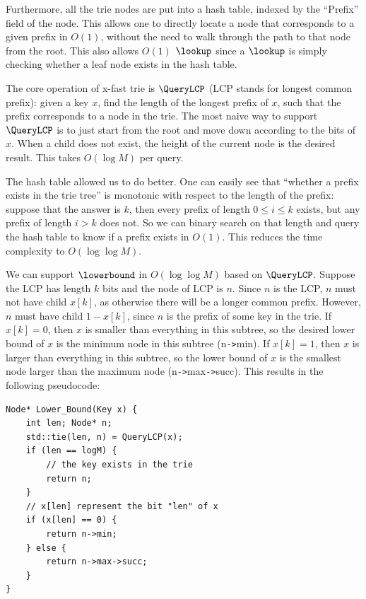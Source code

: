 \documentclass[11pt, usletter]{article}
\begin{document}
Furthermore, all the trie nodes are put into a hash table, indexed by the ``Prefix'' field of the node. 
This allows one to directly locate a node that corresponds to a given prefix in $O(1)$, without the need to walk through the path 
to that node from the root. This also allows $O(1)$ $\lookup$ 
since a $\lookup$ is simply checking whether a leaf node exists in the hash table.

The core operation of x-fast trie is $\QueryLCP$ (LCP stands for longest common prefix): 
given a key $x$, find the length of the longest prefix of $x$, 
such that the prefix corresponds to a node in the trie. The most naive way to support $\QueryLCP$ is to just 
start from the root and move down according to the bits of $x$. When a child does not exist, 
the height of the current node is the desired result. This takes $O(\log M)$ per query.

The hash table allowed us to do better. One can easily see that ``whether a prefix exists in the trie tree'' 
is monotonic with respect to the length of the prefix: suppose that the answer is $k$, 
then every prefix of length $0\leq i\leq k$ exists, but any prefix of length $i>k$ does not. 
So we can binary search on that length and query the hash table to know if a prefix exists in $O(1)$. 
This reduces the time complexity to $O(\log\log M)$. 

We can support $\lowerbound$ in $O(\log\log M)$ based on $\QueryLCP$. 
Suppose the LCP has length $k$ bits and the node of LCP is $n$. 
Since $n$ is the LCP, $n$ must not have child $x[k]$, as otherwise there will be a longer common prefix. 
However, $n$ must have child $1-x[k]$, since $n$ is the prefix of some key in the trie. 
If $x[k]=0$, then $x$ is smaller than everything in this subtree, 
so the desired lower bound of $x$ is the minimum node in this subtree (n\verb|->|min). 
If $x[k]=1$, then $x$ is larger than everything in this subtree, 
so the lower bound of $x$ is the smallest node larger than the maximum node (n\verb|->|max\verb|->|succ). 
This results in the following pseudocode:

\singlespacing\begin{codebox}
\begin{verbatim}
Node* Lower_Bound(Key x) {
    int len; Node* n;
    std::tie(len, n) = QueryLCP(x);
    if (len == logM) {
        // the key exists in the trie
        return n;
    }
    // x[len] represent the bit "len" of x
    if (x[len] == 0) {
        return n->min;
    } else {
        return n->max->succ;
    }
}
\end{verbatim}
\end{codebox}\doublespacing
\end{document}
